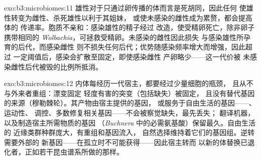 \begin{solution}{exo:b3:microbiomes:11}
雄性对于只通过卵传播的体而言是死胡同，因此任何
使雄性转变为雌性、杀死雄性以利于其姐妹，
或使未感染的雌性成为累赘，都会提高体的
传递率。胞质不亲和：感染雄性的精子经过
改造，使受精卵死亡，除非卵子携带相同的
\emph{Wolbachia}，可拯救受精卵。未感染的雌性因此损失
与感染雄性所孕育的后代，而感染雌性
则不损失任何后代；优势随感染频率增大而增强，因此超过
一定阈值后，感染会扩散至固定，即使感染雌性
产卵略少——这一代价被
未感染雌性后代被毁的比例所抵消。
\end{solution}

\begin{solution}{exo:b3:microbiomes:12}
内体每经历一代宿主，都要经过少量细胞的瓶颈，
且从不与外来者重组：漂变固定
轻度有害的突变（包括缺失）被固定，
且没有替代基因的来源（穆勒棘轮）。其产物由宿主提供的基因，
或服务于自由生活的基因——、运动性、
调控、多数修复相关基因——不会被察觉缺失，最先丢失；
翻译机器，以及制造宿主所需物质的基因
（\emph{Buchnera} 中的必需氨基酸）保留最久。自由生活的
近缘类群种群庞大，有重组和基因流入，
自然选择维持着它们的基因组。逆转需要外部的
新基因——在孤立时不可能获得——因此宿主转而
以新的体替换已退化者，正如若干昆虫谱系所做的那样。
\end{solution}

